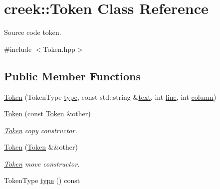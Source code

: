\hypertarget{classcreek_1_1_token}{}\section{creek\+:\+:Token Class Reference}
\label{classcreek_1_1_token}


Source code token.  




{\ttfamily \#include $<$Token.\+hpp$>$}

\subsection*{Public Member Functions}
\begin{DoxyCompactItemize}
\item 
\hyperlink{classcreek_1_1_token_a054f86d9deefc56074e7b0d338cc7e28}{Token} (Token\+Type \hyperlink{classcreek_1_1_token_a6c83b9d98841cef562114e744663db6a}{type}, const std\+::string \&\hyperlink{classcreek_1_1_token_ac3424fac9fc566a59984039e36e40cb0}{text}, int \hyperlink{classcreek_1_1_token_a293d56647d5058c4ae7ecd0031d124b8}{line}, int \hyperlink{classcreek_1_1_token_ae790088c46659553c0233fe9505ac58a}{column})
\item 
\hyperlink{classcreek_1_1_token_aa2bed48bec164de7ce851468a5f8478d}{Token} (const \hyperlink{classcreek_1_1_token}{Token} \&other)\hypertarget{classcreek_1_1_token_aa2bed48bec164de7ce851468a5f8478d}{}\label{classcreek_1_1_token_aa2bed48bec164de7ce851468a5f8478d}

\begin{DoxyCompactList}\small\item\em {\ttfamily \hyperlink{classcreek_1_1_token}{Token}} copy constructor. \end{DoxyCompactList}\item 
\hyperlink{classcreek_1_1_token_ac6f060f5bbfd30458d0b52dc5a05a837}{Token} (\hyperlink{classcreek_1_1_token}{Token} \&\&other)\hypertarget{classcreek_1_1_token_ac6f060f5bbfd30458d0b52dc5a05a837}{}\label{classcreek_1_1_token_ac6f060f5bbfd30458d0b52dc5a05a837}

\begin{DoxyCompactList}\small\item\em {\ttfamily \hyperlink{classcreek_1_1_token}{Token}} move constructor. \end{DoxyCompactList}\item 
Token\+Type \hyperlink{classcreek_1_1_token_a6c83b9d98841cef562114e744663db6a}{type} () const \hypertarget{classcreek_1_1_token_a6c83b9d98841cef562114e744663db6a}{}\label{classcreek_1_1_token_a6c83b9d98841cef562114e744663db6a}


\end{DoxyCompactItemize}
